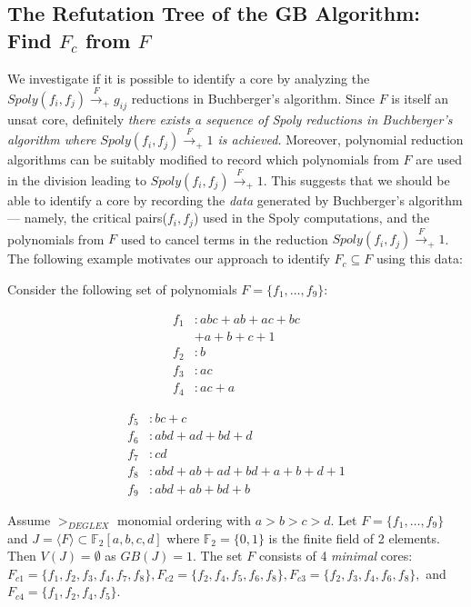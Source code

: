 \subsection{The Refutation Tree of the GB Algorithm: Find $F_c$ from $F$}

We investigate if it is possible to identify a core by analyzing the
$Spoly(f_i,f_j)\xrightarrow{F}_+ g_{ij}$ reductions in Buchberger's
algorithm. Since $F$ is itself an unsat core, 
definitely {\it there exists  
a sequence of Spoly reductions in Buchberger's algorithm where
$Spoly(f_i, f_j) \xrightarrow{F}_+ 1$ is achieved.} Moreover, 
polynomial reduction algorithms can be suitably modified to record
which polynomials from $F$ are used in the division leading to
$Spoly(f_i,f_j)\xrightarrow{F}_+1$. This suggests that 
we should be able to identify a core by recording
the {\it data} generated by Buchberger's algorithm --- namely, the
critical pairs($f_i,f_j$) used in the Spoly computations,
and the polynomials from $F$ used to cancel terms in the reduction
$Spoly(f_i,f_j)\xrightarrow{F}_+1$. The following example motivates
our approach to identify  $F_c \subseteq F$ using this data:

\begin{Example}
\label{ex:1}
Consider the following set of polynomials $F = \{f_1,\dots, f_9\}$:

\begin{minipage}{2in}
\begin{align*}
f_1&: abc + ab + ac + bc \\
   & + a + b + c + 1\\
f_2&: b\\
f_3&: ac\\
f_4&: ac + a
\end{align*}
\end{minipage}
\begin{minipage}{3in}
\begin{align*}
f_5&: bc + c\\
f_6&: abd + ad + bd + d\\
f_7&: cd\\
f_8&: abd + ab + ad + bd + a + b + d + 1\\
f_9&: abd + ab +bd + b
\end{align*}
\end{minipage}



Assume $>_{DEGLEX}$ monomial ordering with $a>b>c>d$. 
Let $F = \{f_1,\dots,f_9\}$ and 
$J = \langle F \rangle \subset \mathbb{F}_2[a,b,c,d]$ where
$\mathbb{F}_2 = \{0, 1\}$ is the finite field of 2 elements. Then 
$V(J) = \emptyset$ as $GB(J) = 1$.  The set $F$ consists of 4 {\it minimal}
cores: $F_{c1} = \{ f_1,f_2,f_3,f_4,f_7,f_8\}, F_{c2} = \{
f_2,f_4,f_5,f_6,f_8\}, F_{c3} = \{ f_2,f_3,f_4,f_6,f_8\},$ and $F_{c4}
= \{ f_1,f_2,f_4,f_5\}$. 
\end{Example}

